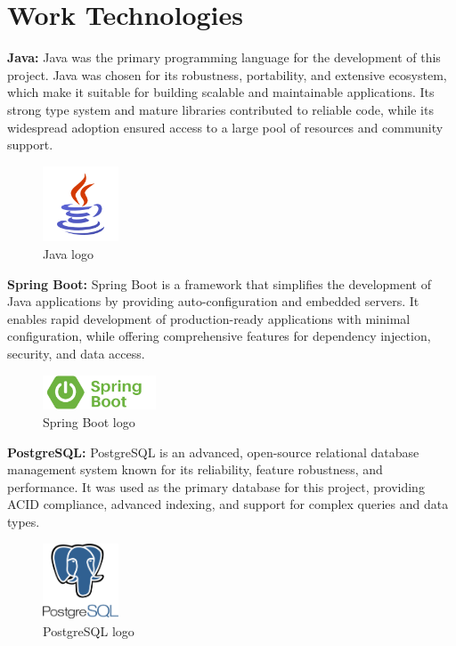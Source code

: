 \section{Work Technologies}
\textbf{Java:}
Java was the primary programming language for the development of this project. Java was chosen for its robustness, portability, and extensive ecosystem, which make it suitable for building scalable and maintainable applications. Its strong type system and mature libraries contributed to reliable code, while its widespread adoption ensured access to a large pool of resources and community support.
\begin{figure}[H]
\centering
\includegraphics[width=0.2\textwidth]{img/tech/java-logo.png}
\caption{Java logo}
\end{figure}

\textbf{Spring Boot:}
Spring Boot is a framework that simplifies the development of Java applications by providing auto-configuration and embedded servers. It enables rapid development of production-ready applications with minimal configuration, while offering comprehensive features for dependency injection, security, and data access.
\begin{figure}[H]
\centering
\includegraphics[width=0.3\textwidth]{img/tech/springboot-logo.png}
\caption{Spring Boot logo}
\end{figure}

\textbf{PostgreSQL:}
PostgreSQL is an advanced, open-source relational database management system known for its reliability, feature robustness, and performance. It was used as the primary database for this project, providing ACID compliance, advanced indexing, and support for complex queries and data types.
\begin{figure}[H]
\centering
\includegraphics[width=0.2\textwidth]{img/tech/postgres-logo.png}
\caption{PostgreSQL logo}
\end{figure}

